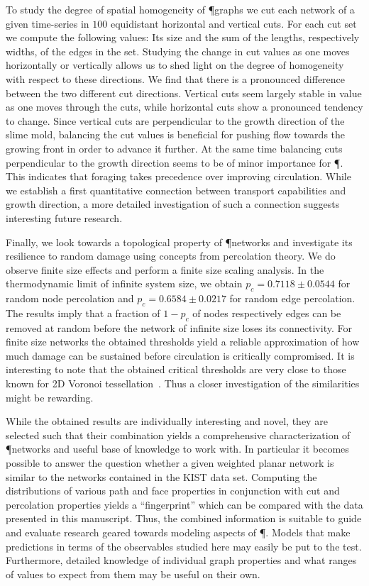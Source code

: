			To study the degree of spatial homogeneity of \P graphs we cut each network of a given time-series in $100$ equidistant horizontal and vertical cuts. For each cut set we compute the following values: Its size and the sum of the lengths, respectively widths, of the edges in the set. Studying the change in cut values as one moves horizontally or vertically allows us to shed light on the degree of homogeneity with respect to these directions. We find that there is a pronounced difference between the two different cut directions. Vertical cuts seem largely stable in value as one moves through the cuts, while horizontal cuts show a pronounced tendency to change. Since vertical cuts are perpendicular to the growth direction of the slime mold, balancing the cut values is beneficial for pushing flow towards the growing front in order to advance it further. At the same time balancing cuts perpendicular to the growth direction seems to be of minor importance for \P. This indicates that foraging takes precedence over improving circulation. While we establish a first quantitative connection between transport capabilities and growth direction, a more detailed investigation of such a connection suggests interesting future research.

			Finally, we look towards a topological property of \P networks and investigate its resilience to random damage using concepts from percolation theory. We do observe finite size effects and perform a finite size scaling analysis. In the thermodynamic limit of infinite system size, we obtain $p_c = 0.7118 \pm 0.0544$ for random node percolation and $p_c = 0.6584 \pm 0.0217$ for random edge percolation. The results imply that a fraction of $1-p_c$ of nodes respectively edges can be removed at random before the network of infinite size loses its connectivity. For finite size networks the obtained thresholds yield a reliable approximation of how much damage can be sustained before circulation is critically compromised. It is interesting to note that the obtained critical thresholds are very close to those known for 2D Voronoi tessellation~\cite{becker2009percolation}. Thus a closer investigation of the similarities might be rewarding.

			While the obtained results are individually interesting and novel, they are selected such that their combination yields a comprehensive characterization of \P networks and useful base of knowledge to work with. In particular it becomes possible to answer the question whether a given weighted planar network is similar to the networks contained in the KIST data set. Computing the distributions of various path and face properties in conjunction with cut and percolation properties yields a ``fingerprint'' which can be compared with the data presented in this manuscript. Thus, the combined information is suitable to guide and evaluate research geared towards modeling aspects of \P. Models that make predictions in terms of the observables studied here may easily be put to the test. Furthermore, detailed knowledge of individual graph properties and what ranges of values to expect from them may be useful on their own.

